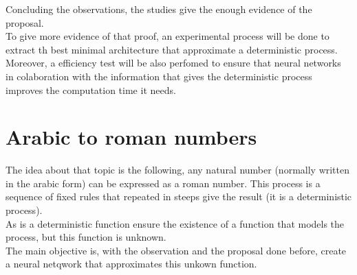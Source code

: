 \documentclass[a4paper, 11pt]{article}
\begin{document}
Concluding the observations, the studies give the enough evidence of the proposal.\\
To give more evidence of that proof, an experimental process will be done to extract th best minimal architecture that approximate a deterministic process.\\
Moreover, a efficiency test will be also perfomed to ensure that neural networks in colaboration with the information that gives the deterministic process improves the computation time it needs.

\section{Arabic to roman numbers}
The idea about that topic is the following, any natural number (normally written in the arabic form) can be expressed as a roman number. This process is a sequence of fixed rules that repeated in steeps give the result (it is a deterministic process).\\
As is a deterministic function ensure the existence of a function that models the process, but this function is unknown.\\
The main objective is, with the observation  and the proposal done before, create a neural netqwork that approximates this unkown function.
\end{document}
